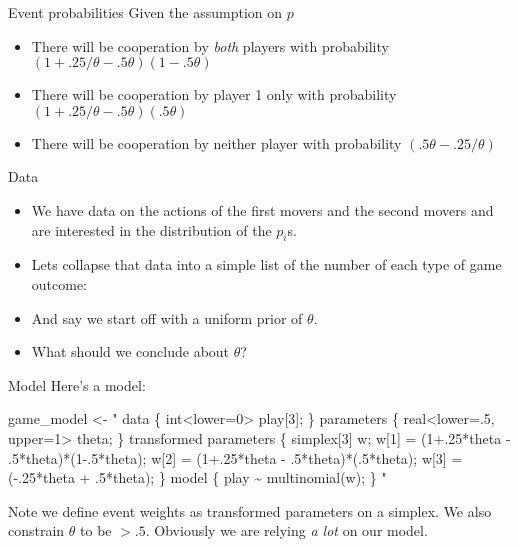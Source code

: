 \documentclass[
  11pt,
  ignorenonframetext,
]{beamer}
\newenvironment{Shaded}{\begin{snugshade}}{\end{snugshade}}
\newcommand{\NormalTok}[1]{\textcolor[rgb]{0.00,0.23,0.31}{#1}}
\newcommand{\OtherTok}[1]{\textcolor[rgb]{0.00,0.23,0.31}{#1}}
\newcommand{\StringTok}[1]{\textcolor[rgb]{0.13,0.47,0.30}{#1}}
\providecommand{\tightlist}{%
  \setlength{\itemsep}{0pt}\setlength{\parskip}{0pt}}\usepackage{longtable,booktabs,array}
\begin{document}
\begin{frame}{Event probabilities}
\protect\hypertarget{event-probabilities-3}{}
Given the assumption on \(p\)

\begin{itemize}
\tightlist
\item
  There will be cooperation by \emph{both} players with probability
  \((1+.25/\theta -.5\theta)(1-.5\theta)\)
\item
  There will be cooperation by player 1 only with probability
  \((1+.25/\theta -.5\theta)(.5\theta)\)
\item
  There will be cooperation by neither player with probability
  \((.5\theta-.25/\theta)\)
\end{itemize}
\end{frame}

\begin{frame}{Data}
\protect\hypertarget{data-1}{}
\begin{itemize}
\item
  We have data on the actions of the first movers and the second movers
  and are interested in the distribution of the \(p_i\)s.
\item
  Lets collapse that data into a simple list of the number of each type
  of game outcome:
\item
  And say we start off with a uniform prior of \(\theta\).
\item
  What should we conclude about \(\theta\)?
\end{itemize}
\end{frame}

\begin{frame}[fragile]{Model}
\protect\hypertarget{model-3}{}
Here's a model:

\tiny

\begin{Shaded}
\begin{Highlighting}[]
\NormalTok{game\_model }\OtherTok{\textless{}{-}} \StringTok{"}
\StringTok{data \{}
\StringTok{  int\textless{}lower=0\textgreater{} play[3];}
\StringTok{\}}
\StringTok{parameters \{}
\StringTok{  real\textless{}lower=.5, upper=1\textgreater{} theta;}
\StringTok{\}}
\StringTok{transformed parameters \{}
\StringTok{simplex[3] w;}
\StringTok{ w[1] = (1+.25*theta {-} .5*theta)*(1{-}.5*theta);}
\StringTok{ w[2] = (1+.25*theta {-} .5*theta)*(.5*theta);}
\StringTok{ w[3] = ({-}.25*theta  + .5*theta);}
\StringTok{\}}
\StringTok{model \{}
\StringTok{  play \textasciitilde{} multinomial(w);}
\StringTok{\}}
\StringTok{"}
\end{Highlighting}
\end{Shaded}

Note we define event weights as transformed parameters on a simplex. We
also constrain \(\theta\) to be \(>.5\). Obviously we are relying
\emph{a lot} on our model.
\end{frame}
\end{document}
